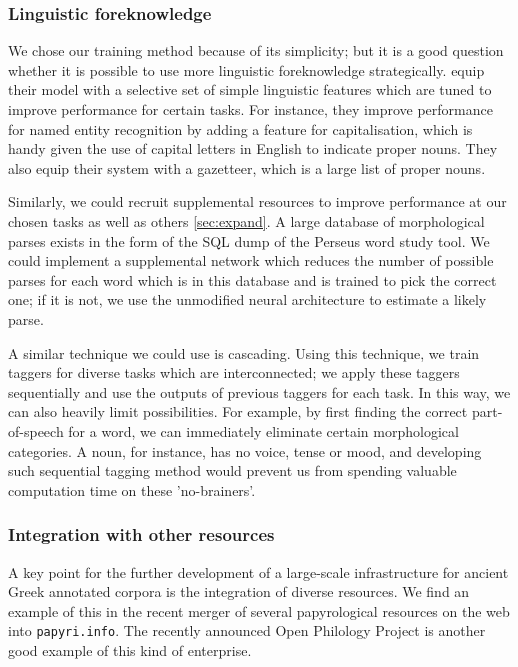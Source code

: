 \subsubsection{Linguistic foreknowledge}
We chose our training method because of its simplicity; but it is a
good question whether it is possible to use more linguistic
foreknowledge strategically. \cite{collobert-2011} equip their model
with a selective set of simple linguistic features which are tuned to
improve performance for certain tasks. For instance, they improve
performance for named entity recognition by adding a feature for
capitalisation, which is handy given the use of capital letters in
English to indicate proper nouns. They also equip their system with a
gazetteer, which is a large list of proper nouns.

Similarly, we could recruit supplemental resources to improve
performance at our chosen tasks as well as others \ref{sec:expand}. A
large database of morphological parses exists in the form of the SQL
dump of the Perseus word study tool. We could implement a supplemental
network which reduces the number of possible parses for each word
which is in this database and is trained to pick the correct one; if
it is not, we use the unmodified neural architecture to estimate a
likely parse.

A similar technique we could use is cascading. Using this technique,
we train taggers for diverse tasks which are interconnected; we apply
these taggers sequentially and use the outputs of previous taggers for
each task. In this way, we can also heavily limit possibilities. For
example, by first finding the correct part-of-speech for a word, we
can immediately eliminate certain morphological categories. A noun,
for instance, has no voice, tense or mood, and developing such
sequential tagging method would prevent us from spending valuable
computation time on these 'no-brainers'.

\subsubsection{Integration with other resources}
A key point for the further development of a large-scale
infrastructure for ancient Greek annotated corpora is the integration
of diverse resources. We find an example of this in the recent
merger of several papyrological resources on the web into
\texttt{papyri.info}. The recently announced Open Philology Project
\citep{crane2013} is another good example of this kind of enterprise.

